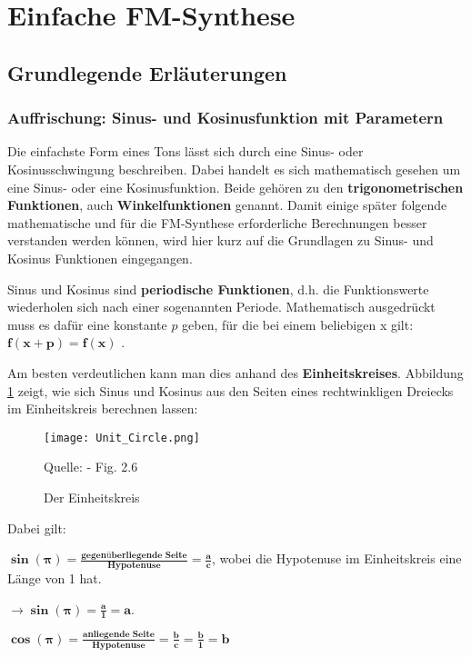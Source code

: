 \section{Einfache FM-Synthese}

\FloatBarrier
\subsection{Grundlegende Erläuterungen}
\subsubsection{Auffrischung: Sinus- und Kosinusfunktion mit Parametern}
Die einfachste Form eines Tons lässt sich durch eine Sinus- oder Kosinusschwingung beschreiben. Dabei handelt es sich mathematisch gesehen um eine Sinus- oder eine Kosinusfunktion. Beide gehören zu den \textbf{trigonometrischen Funktionen}, auch \textbf{Winkelfunktionen} genannt. Damit einige später folgende mathematische und für die FM-Synthese erforderliche Berechnungen besser verstanden werden können, wird hier kurz auf die Grundlagen zu Sinus- und Kosinus Funktionen eingegangen. 

Sinus und Kosinus sind \textbf{periodische Funktionen}, d.h. die Funktionswerte wiederholen sich nach einer sogenannten Periode. Mathematisch ausgedrückt muss es dafür eine konstante $p$  geben, für die bei einem beliebigen x gilt: $\bm{f(x + p) =  f(x)}$ .

Am besten verdeutlichen kann man dies anhand des \textbf{Einheitskreises}. Abbildung \ref{fig:unitcircle} zeigt, wie sich Sinus und Kosinus aus den Seiten eines rechtwinkligen Dreiecks im Einheitskreis berechnen lassen:

\begin{figure} [ht]
\centering
\texttt{[image: Unit\_Circle.png]}
\caption{Der Einheitskreis}
\label{fig:unitcircle}
Quelle: \cite{fmtheory} - Fig. 2.6
\end{figure}

Dabei gilt: 

$\bm{\sin(\pmb{\pi}) = \frac{\textbf{gegenüberliegende Seite}}{\textbf{Hypotenuse}} = \frac{a}{c}}$, wobei die Hypotenuse im Einheitskreis eine Länge von 1 hat. 

$\bm{\to\sin(\pmb{\pi}) = \frac{a}{1} = a}$.

$\bm{\cos(\pmb{\pi}) = \frac{\textbf{anliegende Seite}}{\textbf{Hypotenuse}} = \frac{b}{c} = \frac{b}{1} = b}$ \cite[s. 22 - 27]{fmtheory} \\


